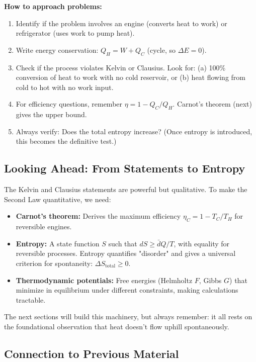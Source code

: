 \documentclass[9pt,twocoloumn]{article}
\begin{document}
\textbf{How to approach problems:}
\begin{enumerate}
    \item Identify if the problem involves an engine (converts heat to work) or refrigerator (uses work to pump heat).
    \item Write energy conservation: $Q_H = W + Q_C$ (cycle, so $\Delta E = 0$).
    \item Check if the process violates Kelvin or Clausius. Look for: (a) 100\% conversion of heat to work with no cold reservoir, or (b) heat flowing from cold to hot with no work input.
    \item For efficiency questions, remember $\eta = 1 - Q_C/Q_H$. Carnot's theorem (next) gives the upper bound.
    \item Always verify: Does the total entropy increase? (Once entropy is introduced, this becomes the definitive test.)
\end{enumerate}

\subsection{Looking Ahead: From Statements to Entropy}

The Kelvin and Clausius statements are powerful but qualitative. To make the Second Law quantitative, we need:
\begin{itemize}
    \item \textbf{Carnot's theorem:} Derives the maximum efficiency $\eta_C = 1 - T_C/T_H$ for reversible engines.
    \item \textbf{Entropy:} A state function $S$ such that $dS \geq \bar{d}Q/T$, with equality for reversible processes. Entropy quantifies "disorder" and gives a universal criterion for spontaneity: $\Delta S_{\text{total}} \geq 0$.
    \item \textbf{Thermodynamic potentials:} Free energies (Helmholtz $F$, Gibbs $G$) that minimize in equilibrium under different constraints, making calculations tractable.
\end{itemize}

The next sections will build this machinery, but always remember: it all rests on the foundational observation that heat doesn't flow uphill spontaneously.

\subsection{Connection to Previous Material}
\end{document}

